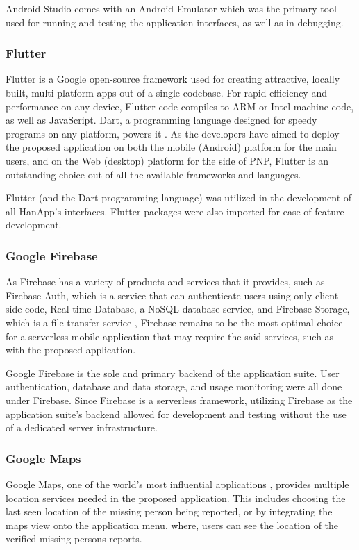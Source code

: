 Android Studio comes with an Android Emulator which was the primary tool used for running and testing the application interfaces, as well as in debugging.

\subsubsection{Flutter}
Flutter is a Google open-source framework used for creating attractive, locally built, multi-platform apps out of a single codebase. For rapid efficiency and performance on any device, Flutter code compiles to ARM or Intel machine code, as well as JavaScript. Dart, a programming language designed for speedy programs on any platform, powers it \cite{flutter}. As the developers have aimed to deploy the proposed application on both the mobile (Android) platform for the main users, and on the Web (desktop)  platform for the side of PNP, Flutter is an outstanding choice out of all the available frameworks and languages.

Flutter (and the Dart programming language) was utilized in the development of all HanApp's interfaces. Flutter packages were also imported for ease of feature development.

\subsubsection{Google Firebase}
As Firebase has a variety of products and services that it provides, such as Firebase Auth, which is a service that can authenticate users using only client-side code, Real-time Database, a NoSQL database service, and Firebase Storage, which is a file transfer service \cite{khawas2018application}, Firebase remains to be the most optimal choice for a serverless mobile application that may require the said services, such as with the proposed application.

Google Firebase is the sole and primary backend of the application suite. User authentication, database and data storage, and usage monitoring were all done under Firebase. Since Firebase is a serverless framework, utilizing Firebase as the application suite's backend allowed for development and testing without the use of a dedicated server infrastructure. 

\subsubsection{Google Maps}
Google Maps, one of the world’s most influential applications \cite{mehta2019google}, provides multiple location services needed in the proposed application. This includes choosing the last seen location of the missing person being reported, or by integrating the maps view onto the application menu, where, users can see the location of the verified missing persons reports. 

